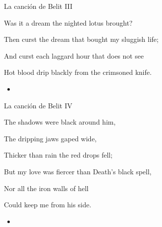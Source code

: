 \begin{frame}{La canción de Belit III}
	\begin{exampleblock}{}
		Was it a dream the nighted lotus brought?

		Then curst the dream that bought my sluggish life;

		And curst each laggard hour that does not see

		Hot blood drip blackly from the crimsoned knife.
	\end{exampleblock}

	\begin{itemize}
		\item \textit{  }
	\end{itemize}
\end{frame}
\note[itemize]{
	\item
}

\begin{frame}{La canción de Belit IV}
	\begin{exampleblock}{}
		The shadows were black around him,

		The dripping jaws gaped wide,

		Thicker than rain the red drops fell;

		But my love was fiercer than Death’s black spell,

		Nor all the iron walls of hell

		Could keep me from his side.
	\end{exampleblock}

	\begin{itemize}
		\item \textit{  }
	\end{itemize}
\end{frame}
\note[itemize]{
	\item
}

